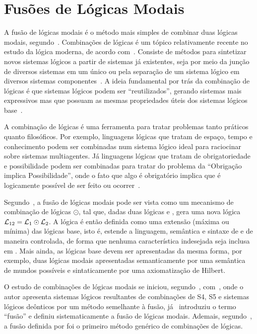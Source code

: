 \chapter{Fusões de Lógicas Modais}
    \label{cap:FusoesLogicasModais}
    A fusão de lógicas modais é o método mais simples de combinar duas lógicas modais, segundo~. Combinações de lógicas
    é um tópico relativamente recente no estudo da lógica moderna, de acordo com~. Consiste de métodos para sintetizar
    novos sistemas lógicos a partir de sistemas já existentes, seja por meio da junção de diversos sistemas em um único ou pela separação de um sistema
    lógico em diversos sistemas componentes~\cite{carnielli2008analysis}. A ideia fundamental por trás da combinação de lógicas é que sistemas lógicos
    podem ser ``reutilizados'', gerando sistemas mais expressivos mas que possuam as mesmas propriedades úteis dos sistemas lógicos base~\cite{roggia2012fusion}.

    A combinação de lógicas é uma ferramenta para tratar problemas tanto práticos quanto filosóficos. Por exemplo, linguagens lógicas que tratam de espaço,
    tempo e conhecimento podem ser combinadas num sistema lógico ideal para raciocinar sobre sistemas multiagentes. Já linguagens lógicas que tratam de
    obrigatoriedade e possibilidade podem ser combinadas para tratar do problema da ``Obrigação implica Possibilidade'', onde o fato que algo é obrigatório
    implica que é logicamente possível de ser feito ou ocorrer~\cite{carnielli2008analysis}.

    Segundo~, a fusão de lógicas modais pode ser vista como um mecanismo de combinação de lógicas \(\odot\), tal que, dadas duas
    lógicas  e , gera uma nova lógica \(\mathcal{L}_{12} = \mathcal{L}_1 \mathbin{\odot} \mathcal{L}_2\). A lógica 
    é então definida como uma extensão (máxima ou mínima) das lógicas base, isto é, estende a linguagem, semântica e sintaxe de  e 
    de maneira controlada, de forma que nenhuma característica indesejada seja inclusa em . Mais ainda, as lógicas base devem ser apresentadas da mesma
    forma, por exemplo, duas lógicas modais apresentadas semanticamente por uma semântica de mundos possíveis e sintaticamente por uma axiomatização de Hilbert.

    O estudo de combinações de lógicas modais se iniciou, segundo~, com~, onde o autor apresenta sistemas lógicos
    resultantes de combinações de S4, S5 e sistemas lógicos deônticos por um método semelhante à fusão, já~ introduziu
    o termo ``fusão'' e definiu sistematicamente a fusão de lógicas modais. Ademais, segundo~, a fusão definida por
     foi o primeiro método genérico de combinações de lógicas.

